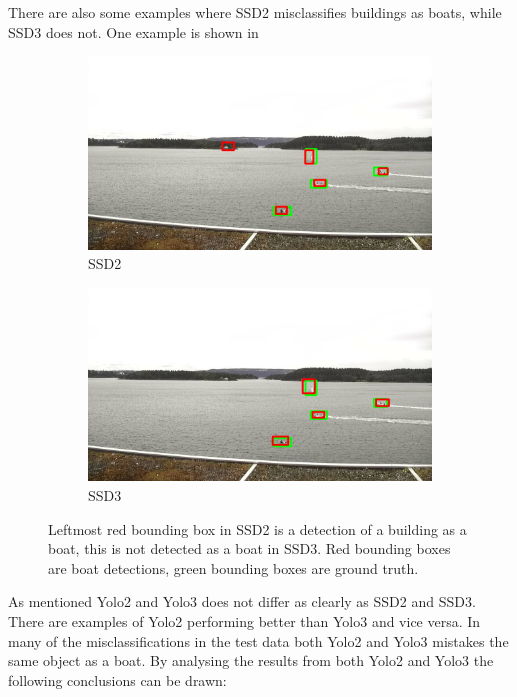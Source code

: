 There are also some examples where SSD2 misclassifies buildings as boats, while SSD3 does not. One example is shown in 

\begin{figure}[h!]
\begin{subfigure}{.5\textwidth}
  \centering
  \includegraphics[width=0.9\linewidth]{results/case_buildings/misclass/selected_08_07_frame11982_bbnb.jpg}
  \caption{SSD2}
  \label{fig:misclass_ssd2}
\end{subfigure}%
\begin{subfigure}{.5\textwidth}
  \centering
  \includegraphics[width=.9\linewidth]{results/case_buildings/misclass/selected_08_07_frame11982_build.jpg}
  \caption{SSD3}
  \label{fig:misclass_ssd3}
\end{subfigure}
\caption{Leftmost red bounding box in SSD2 is a detection of a building as a boat, this is not detected as a boat in SSD3. Red bounding boxes are boat detections, green bounding boxes are ground truth.}
\label{img:misclass_ssd}
\end{figure}

\vspace{3mm}

As mentioned Yolo2 and Yolo3 does not differ as clearly as SSD2 and SSD3. There are examples of Yolo2 performing better than Yolo3 and vice versa. In many of the misclassifications in the test data both Yolo2 and Yolo3 mistakes the same object as a boat. By analysing the results from both Yolo2 and Yolo3 the following conclusions can be drawn:

